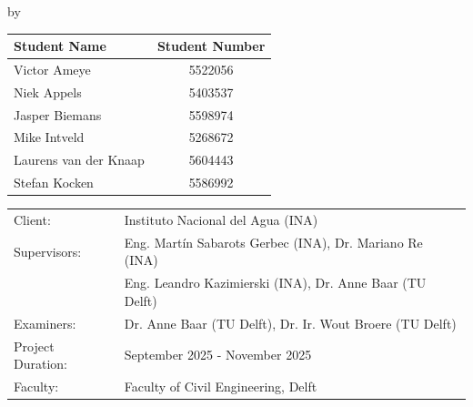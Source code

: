\begin{titlepage}

\begin{center}

{\makeatletter
\largetitlestyle\fontsize{45}{45}\selectfont\@title
\makeatother}

{\makeatletter
\ifdefvoid{\@subtitle}{}{\bigskip\titlestyle\fontsize{20}{20}\selectfont\@subtitle}
\makeatother}

\bigskip
\bigskip

by

\bigskip
\bigskip

{\makeatletter
\largetitlestyle\fontsize{25}{25}\selectfont\@author
\makeatother}

\bigskip
\bigskip

\setlength\extrarowheight{2pt}
\begin{tabular}{lc}
    Student Name & Student Number \\\midrule
    Victor Ameye & 5522056 \\
    Niek Appels & 5403537 \\
    Jasper Biemans & 5598974 \\
    Mike Intveld & 5268672 \\
    Laurens van der Knaap & 5604443 \\
    Stefan Kocken & 5586992 \\    
\end{tabular}

\vfill

\begin{tabular}{ll}
    Client: & Instituto Nacional del Agua (INA) \\
    Supervisors: & Eng. Martín Sabarots Gerbec (INA), Dr. Mariano Re (INA) \\ 
                 & Eng. Leandro Kazimierski (INA), Dr. Anne Baar (TU Delft) \\
    Examiners: & Dr. Anne Baar (TU Delft), Dr. Ir. Wout Broere (TU Delft) \\
    Project Duration: & September 2025 - November 2025 \\
    Faculty: & Faculty of Civil Engineering, Delft
\end{tabular}

\bigskip
\bigskip



\end{center}
\end{titlepage}
